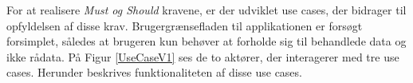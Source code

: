 %
%
%
%
%

\pagebreak
For at realisere \textit{Must og Should } kravene, er der udviklet use cases, der bidrager til opfyldelsen af disse krav. Brugergrænsefladen til applikationen er forsøgt forsimplet, således at brugeren kun behøver at forholde sig til behandlede data og ikke rådata. På Figur \ref{UseCaseV1} ses de to aktører, der interagerer med tre use cases.  Herunder beskrives funktionaliteten af disse use cases. 


